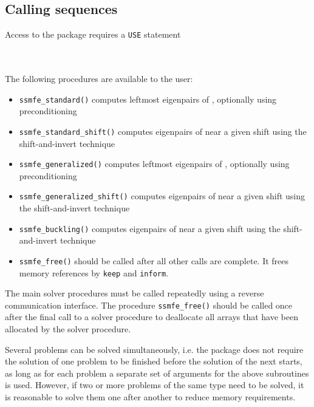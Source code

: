 \subsection{Calling sequences}

\label{sec:call}

Access to the package requires a {\tt USE} statement \\ \\
\indent\hspace{8mm}{\tt use \fullpackagename} \\

\medskip

\noindent The following procedures are available to the user:
%
\begin{itemize}
\vspace{-0.1cm}
\item {\tt ssmfe\_standard()} 
computes leftmost eigenpairs of , 
optionally using preconditioning
\item {\tt ssmfe\_standard\_shift()} 
computes eigenpairs of  near a given shift
using the shift-and-invert technique
\item {\tt ssmfe\_generalized()} 
computes leftmost eigenpairs of 
, optionally using preconditioning
\item {\tt ssmfe\_generalized\_shift()} 
computes eigenpairs of 
 near a given shift
using the shift-and-invert technique
\item {\tt ssmfe\_buckling()} 
computes eigenpairs of 
 near a given shift
using the shift-and-invert technique
\item {\tt ssmfe\_free()} should be called after all other calls
are complete. It frees memory references by \texttt{keep} and \texttt{inform}.
%
\end{itemize}

The main solver procedures
must be called repeatedly using
a reverse communication interface.
The procedure \texttt{ssmfe\_free()}
should be called once after the
final call to 
a solver procedure
to deallocate all arrays 
that have been allocated by
the solver procedure.

Several problems can be solved simultaneously,
i.e. the package does not require the solution of
one problem to be finished before the solution of
the next starts, as long as for each problem a separate set
of arguments for the above subroutines is used.
However, if two or more problems of the same type
need to be solved, it is reasonable to solve them one
after another  to reduce  memory requirements.
\fi

